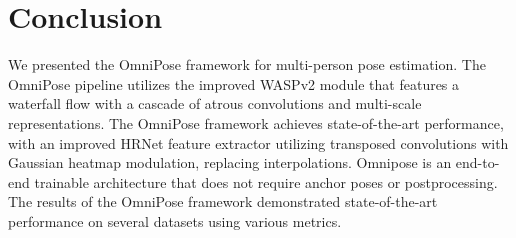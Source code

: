 \documentclass[10pt,twocolumn,letterpaper]{article}
\begin{document}
\section{Conclusion}
We presented the OmniPose framework for multi-person pose estimation.
The OmniPose pipeline utilizes the improved WASPv2 module that features a waterfall flow with a cascade of atrous convolutions and multi-scale representations. 
The OmniPose framework achieves state-of-the-art performance, with an improved HRNet feature extractor utilizing transposed convolutions with Gaussian heatmap modulation, replacing interpolations.
Omnipose is an end-to-end trainable architecture that does not require anchor poses or postprocessing.
The results of the OmniPose framework demonstrated state-of-the-art performance on several datasets using various metrics. 



{\small


}
\end{document}
